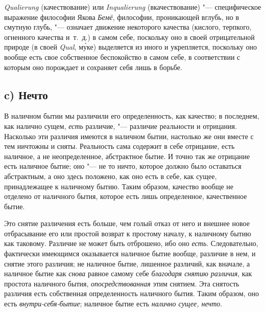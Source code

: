 {\em Qualierung} (качествование) или
{\em Inqualierung} (вкачествование) "--- специфическое
выражение философии Якова {\em Бемё}, философии,
проникающей вглубь, но в смутную глубь, "--- означает движение некоторого
качества (кислого, терпкого, огненного качества и~т.~д.) в самом себе,
поскольку оно в своей отрицательной природе (в своей
{\em Qual},
м\`{у}ке) выделяется из иного и укрепляется, поскольку оно
вообще есть свое собственное беспокойство в самом себе, в соответствии с
которым оно порождает и сохраняет себя лишь в борьбе.

\subsection[c) Нечто]{c) Нечто}
В наличном бытии мы различили его определенность, как качество; в последнем,
как налично сущем, {\em есть} различие, "--- различие
реальности и отрицания. Насколько эти различия имеются в наличном бытии,
настолько же они вместе с тем ничтожны и сняты. Реальность сама содержит в
себе отрицание, есть наличное, а не неопределенное, абстрактное бытие. И
точно так же отрицание есть наличное бытие; оно "--- не то ничто, которое
должно было оставаться абстрактным, а оно здесь положено, как оно есть в
себе, как сущее, принадлежащее к наличному бытию. Таким образом, качество
вообще не отделено от наличного бытия, которое есть лишь определенное,
качественное бытие.

Это снятие различения есть больше, чем голый отказ от него и внешнее новое
отбрасывание его или простой возврат к простому началу, к наличному бытию
как таковому. Различие не может быть отброшено, ибо оно
{\em есть}. Следовательно, фактически имеющимся
оказывается наличное бытие вообще, различие в нем, и снятие этого различия;
не наличное бытие, лишенное различий, как вначале, а наличное бытие как
{\em снова} равное самому себе
{\em благодаря снятию различия}, как простота наличного
бытия, {\em опосредствованная} этим снятием. Эта
снятость различия есть собственная определенность наличного бытия. Таким
образом, оно есть {\em внутри-себя-бытие}; наличное
бытие есть {\em налично сущее, нечто}.

